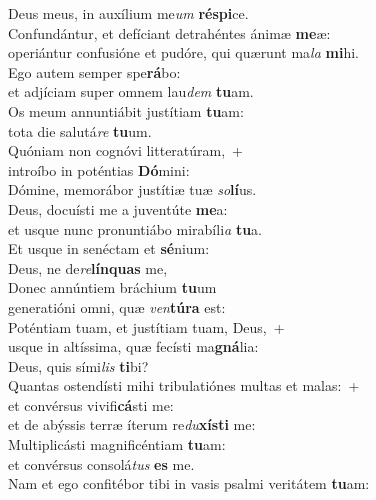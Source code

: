 \oddverse Deus meus, in auxílium me\textit{um} \textbf{ré}\textbf{spi}ce.\\
\evenverse Confundántur, et defíciant detrahéntes ánimæ \textbf{me}æ:~\*\\
\evenverse operiántur confusióne et pudóre, qui quærunt ma\textit{la} \textbf{mi}hi.\\
\oddverse Ego autem semper spe\textbf{rá}bo:~\*\\
\oddverse et adjíciam super omnem lau\textit{dem} \textbf{tu}am.\\
\evenverse Os meum annuntiábit justítiam \textbf{tu}am:~\*\\
\evenverse tota die salutá\textit{re} \textbf{tu}um.\\
\oddverse Quóniam non cognóvi litteratúram,~+\\
\oddverse  introíbo in poténtias \textbf{Dó}mini:~\*\\
\oddverse Dómine, memorábor justítiæ tuæ \textit{so}\textbf{lí}us.\\
\evenverse Deus, docuísti me a juventúte \textbf{me}a:~\*\\
\evenverse et usque nunc pronuntiábo mirabíli\textit{a} \textbf{tu}a.\\
\oddverse Et usque in senéctam et \textbf{sé}nium:~\*\\
\oddverse Deus, ne de\textit{re}\textbf{lín}\textbf{quas} me,\\
\evenverse Donec annúntiem bráchium \textbf{tu}um~\*\\
\evenverse generatióni omni, quæ \textit{ven}\textbf{tú}\textbf{ra} est:\\
\oddverse Poténtiam tuam, et justítiam tuam, Deus,~+\\
\oddverse  usque in altíssima, quæ fecísti ma\textbf{gná}lia:~\*\\
\oddverse Deus, quis sími\textit{lis} \textbf{ti}bi?\\
\evenverse Quantas ostendísti mihi tribulatiónes multas et malas:~+\\
\evenverse  et convérsus vivifi\textbf{cá}sti me:~\*\\
\evenverse et de abýssis terræ íterum re\textit{du}\textbf{xí}\textbf{sti} me:\\
\oddverse Multiplicásti magnificéntiam \textbf{tu}am:~\*\\
\oddverse et convérsus consolá\textit{tus} \textbf{es} me.\\
\evenverse Nam et ego confitébor tibi in vasis psalmi veritátem \textbf{tu}am:~\*\\
